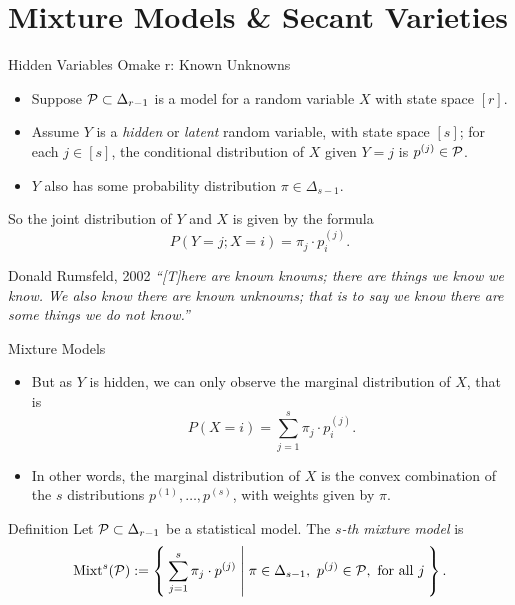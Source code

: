 \section{Mixture Models \& Secant Varieties}

\begin{frame}{Hidden Variables Omake
r: Known Unknowns}
    \begin{itemize}
    \item Suppose $\mathcal{P} \subset \Delta_{r-1}$ is a model for a random variable $X$ with state space $[r]$.
    \item Assume $Y$ is a \emph{hidden} or \emph{latent} random variable, with state space $[s]$; for each $j \in [s]$, the conditional distribution of $X$ given $Y = j$ is $p^{(j)} \in \mathcal{P}$. 
    \item $Y$ also has some probability distribution $\pi \in \Delta_{s-1}$.
    \end{itemize}

    So the joint distribution of $Y$ and $X$ is given by the formula
    $$ P(Y = j; X = i) = \pi_{j} \cdot p_{i}^{(j)}. $$

    \begin{block}{Donald Rumsfeld, 2002}
        \emph{``[T]here are known knowns; there are things we know we know. We also know there are known unknowns; that is to say we know there are some things we do not know.''}
    \end{block}

\end{frame}

\begin{frame}{Mixture Models}

    \begin{itemize}
    \item But as $Y$ is hidden, we can only observe the marginal distribution of $X$, that is
    $$ P(X = i) = \sum_{j = 1}^{s} \pi_{j} \cdot p_{i}^{(j)}. $$
    \item In other words, the marginal distribution of $X$ is the convex combination of the $s$ distributions $p^{(1)}, \ldots, p^{(s)}$, with weights given by $\pi$.
    \end{itemize}

    \begin{block}{Definition \cite{BSSSMD2009}}
        Let $\mathcal{P} \subset \Delta_{r-1}$ be a statistical model. The \emph{$s$-th mixture model} is
        $$ \Mixt^{s}(\mc{P}) := \Set{ \sum_{j = 1}^{s} \pi_{j}\cdot p^{(j)} | \pi \in \Delta_{s-1},\ p^{(j)} \in \mc{P}, \text{ for all } j }. $$
    \end{block}

\end{frame}

